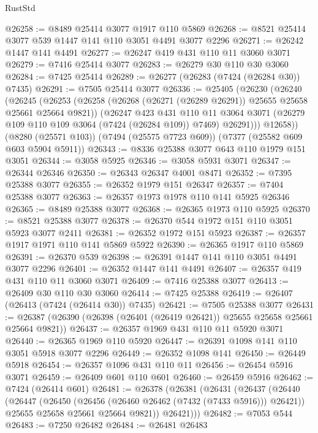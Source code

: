 \begin{lexlean}{RustStd}
\begin{coremodule}
@26258 := @8489 @25414 @3077 @1917 @110 @5869
@26268 := @8521 @25414 @3077 @539 @1447 @141 @110 @3051 @4491 @3077 @2296
@26271 := @26242 @1447 @141 @4491
@26277 := @26247 @419 @431 @110 @11 @3060 @3071
@26279 := @7416 @25414 @3077
@26283 := @26279 @30 @110 @30 @3060
@26284 := @7425 @25414
@26289 := @26277 (@26283 (@7424 (@26284 @30)) @7435)
@26291 := @7505 @25414 @3077
@26336 := @25405
    (@26230
      (@26240
        (@26245
          (@26253
            (@26258 (@26268 (@26271 (@26289 @26291)) @25655 @25658 @25661 @25664 @9821))
            (@26247
              @423
              @431
              @110
              @11
              @3064
              @3071
              (@26279 @109 @110 @109 @3064 (@7424 (@26284 @109)) @7469)
              @26291)))
        @12658))
    (@8280 (@25571 @103))
    (@7494 (@25575 @7723 @609))
    (@7377 (@25582 @609 @603 @5904 @5911))
@26343 := @8336 @25388 @3077 @643 @110 @1979 @151 @3051
@26344 := @3058 @5925
@26346 := @3058 @5931 @3071
@26347 := @26344 @26346
@26350 := @26343 @26347 @4001 @8471
@26352 := @7395 @25388 @3077
@26355 := @26352 @1979 @151 @26347
@26357 := @7404 @25388 @3077
@26363 := @26357 @1973 @1978 @110 @141 @5925 @26346
@26365 := @8489 @25388 @3077
@26368 := @26365 @1973 @110 @5925
@26370 := @8521 @25388 @3077
@26378 := @26370 @544 @1972 @151 @110 @3051 @5923 @3077 @2411
@26381 := @26352 @1972 @151 @5923
@26387 := @26357 @1917 @1971 @110 @141 @5869 @5922
@26390 := @26365 @1917 @110 @5869
@26391 := @26370 @539
@26398 := @26391 @1447 @141 @110 @3051 @4491 @3077 @2296
@26401 := @26352 @1447 @141 @4491
@26407 := @26357 @419 @431 @110 @11 @3060 @3071
@26409 := @7416 @25388 @3077
@26413 := @26409 @30 @110 @30 @3060
@26414 := @7425 @25388
@26419 := @26407 (@26413 (@7424 (@26414 @30)) @7435)
@26421 := @7505 @25388 @3077
@26431 := @26387 (@26390 (@26398 (@26401 (@26419 @26421)) @25655 @25658 @25661 @25664 @9821))
@26437 := @26357 @1969 @431 @110 @11 @5920 @3071
@26440 := @26365 @1969 @110 @5920
@26447 := @26391 @1098 @141 @110 @3051 @5918 @3077 @2296
@26449 := @26352 @1098 @141
@26450 := @26449 @5918
@26454 := @26357 @1096 @431 @110 @11
@26456 := @26454 @5916 @3071
@26459 := @26409 @601 @110 @601
@26460 := @26459 @5916
@26462 := @7424 (@26414 @601)
@26481 := @26378
    (@26381
      (@26431
        (@26437
          (@26440
            (@26447
              (@26450 (@26456 (@26460 @26462 (@7432 (@7433 @5916))) @26421))
              @25655
              @25658
              @25661
              @25664
              @9821))
          @26421)))
@26482 := @7053 @544
@26483 := @7250 @26482
@26484 := @26481 @26483

\end{coremodule}
\end{lexlean}
